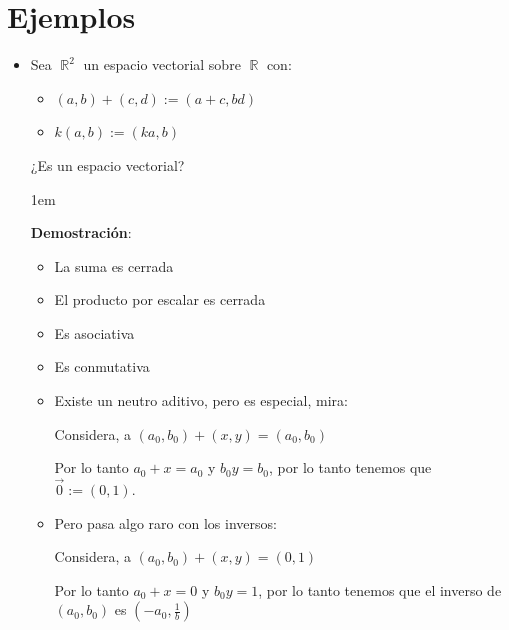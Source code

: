 \documentclass[12pt, fleqn]{report}                             %
\newenvironment{SmallIndentation}[1][0.75em]                    %
        {\begin{adjustwidth}{#1}{}\begin{footnotesize}}             %
        {\end{footnotesize}\end{adjustwidth}}                       %
\theoremstyle{break}                                            %
\DeclareMathOperator \Reals        {\mathbb{R}}                 %
\begin{document}
        \clearpage
        \section{Ejemplos}

            \begin{itemize}
                \item 
                    Sea $\Reals^2$ un espacio vectorial sobre $\Reals$ con:
                    \begin{itemize}
                        \item $(a, b) + (c, d) := (a+c, bd)$
                        \item $k(a, b) := (ka, b)$
                    \end{itemize}

                    ¿Es un espacio vectorial?

                    \begin{SmallIndentation}[1em]
                        \textbf{Demostración}:
                        
                        \begin{itemize}
                            \item La suma es cerrada
                            \item El producto por escalar es cerrada
                            \item Es asociativa
                            \item Es conmutativa
                            \item Existe un neutro aditivo, pero es especial, mira:

                                Considera, a $(a_0, b_0) + (x, y) = (a_0, b_0)$

                                Por lo tanto $a_0 + x = a_0$ y $b_0y = b_0$, por lo
                                tanto tenemos que $\vec 0 := (0, 1)$.

                            \item Pero pasa algo raro con los inversos:

                                Considera, a $(a_0, b_0) + (x, y) = (0, 1)$

                                Por lo tanto $a_0 + x = 0$ y $b_0y = 1$, por lo
                                tanto tenemos que el inverso de $(a_0, b_0)$ es
                                $(-a_0, \frac{1}{b})$


\end{itemize}
\end{SmallIndentation}
\end{itemize}
\end{document}
